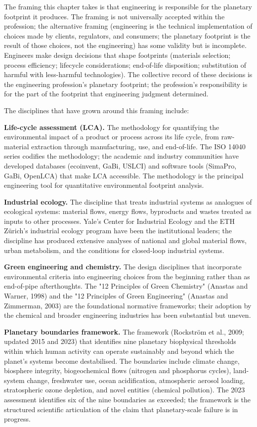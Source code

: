 The framing this chapter takes is that engineering is responsible for the planetary footprint it produces. The framing is not universally accepted within the profession; the alternative framing (engineering is the technical implementation of choices made by clients, regulators, and consumers; the planetary footprint is the result of those choices, not the engineering) has some validity but is incomplete. Engineers make design decisions that shape footprints (materials selection; process efficiency; lifecycle considerations; end-of-life disposition; substitution of harmful with less-harmful technologies). The collective record of these decisions is the engineering profession's planetary footprint; the profession's responsibility is for the part of the footprint that engineering judgment determined.

The disciplines that have grown around this framing include:

\textbf{Life-cycle assessment (LCA).} The methodology for quantifying the environmental impact of a product or process across its life cycle, from raw-material extraction through manufacturing, use, and end-of-life. The ISO 14040 series codifies the methodology; the academic and industry communities have developed databases (ecoinvent, GaBi, USLCI) and software tools (SimaPro, GaBi, OpenLCA) that make LCA accessible. The methodology is the principal engineering tool for quantitative environmental footprint analysis.

\textbf{Industrial ecology.} The discipline that treats industrial systems as analogues of ecological systems: material flows, energy flows, byproducts and wastes treated as inputs to other processes. Yale's Center for Industrial Ecology and the ETH Zürich's industrial ecology program have been the institutional leaders; the discipline has produced extensive analyses of national and global material flows, urban metabolism, and the conditions for closed-loop industrial systems.

\textbf{Green engineering and chemistry.} The design disciplines that incorporate environmental criteria into engineering choices from the beginning rather than as end-of-pipe afterthoughts. The "12 Principles of Green Chemistry" (Anastas and Warner, 1998) and the "12 Principles of Green Engineering" (Anastas and Zimmerman, 2003) are the foundational normative frameworks; their adoption by the chemical and broader engineering industries has been substantial but uneven.

\textbf{Planetary boundaries framework.} The framework (Rockström et al., 2009; updated 2015 and 2023) that identifies nine planetary biophysical thresholds within which human activity can operate sustainably and beyond which the planet's systems become destabilised. The boundaries include climate change, biosphere integrity, biogeochemical flows (nitrogen and phosphorus cycles), land-system change, freshwater use, ocean acidification, atmospheric aerosol loading, stratospheric ozone depletion, and novel entities (chemical pollution). The 2023 assessment identifies six of the nine boundaries as exceeded; the framework is the structured scientific articulation of the claim that planetary-scale failure is in progress.

